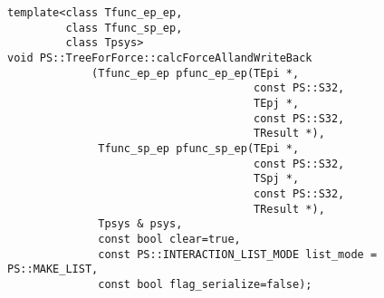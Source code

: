 \begin{screen}
\begin{verbatim}
template<class Tfunc_ep_ep,
         class Tfunc_sp_ep,
         class Tpsys>
void PS::TreeForForce::calcForceAllandWriteBack
             (Tfunc_ep_ep pfunc_ep_ep(TEpi *,
                                      const PS::S32,
                                      TEpj *,
                                      const PS::S32,
                                      TResult *),
              Tfunc_sp_ep pfunc_sp_ep(TEpi *,
                                      const PS::S32,
                                      TSpj *,
                                      const PS::S32,
                                      TResult *),
              Tpsys & psys,
              const bool clear=true,
              const PS::INTERACTION_LIST_MODE list_mode = PS::MAKE_LIST,
              const bool flag_serialize=false);
\end{verbatim}
\end{screen}

